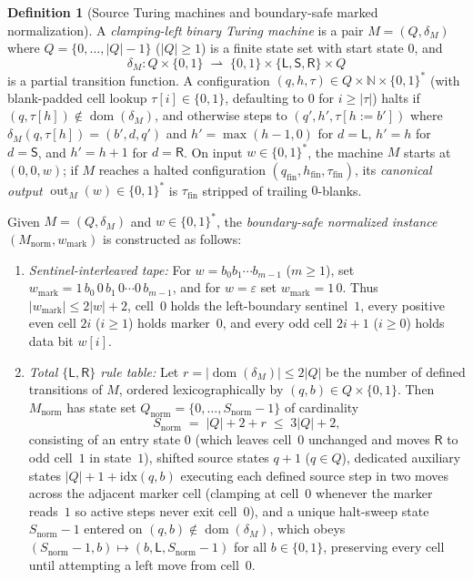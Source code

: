\documentclass[11pt,reqno]{amsart}
\numberwithin{equation}{section}
\theoremstyle{plain}
\theoremstyle{definition}
\newtheorem{definition}[theorem]{Definition}
\theoremstyle{remark}
\DeclareMathOperator{\out}{out}
\DeclareMathOperator{\dom}{dom}
\begin{document}
\begin{definition}[Source Turing machines and boundary-safe marked normalization]\label{def:source-norm}
A \emph{clamping-left binary Turing machine} is a pair $M = (Q, \delta_M)$ where $Q = \{0, \dots, |Q|-1\}$ ($|Q| \ge 1$) is a finite state set with start state $0$, and
\[
  \delta_M \colon Q \times \{0, 1\} \;\rightharpoonup\; \{0, 1\} \times \{\mathsf{L}, \mathsf{S}, \mathsf{R}\} \times Q
\]
is a partial transition function. A configuration $(q, h, \tau) \in Q \times \mathbb{N} \times \{0,1\}^*$ (with blank-padded cell lookup $\tau[i] \in \{0,1\}$, defaulting to $0$ for $i \ge |\tau|$) halts if $(q, \tau[h]) \notin \dom(\delta_M)$, and otherwise steps to $(q', h', \tau[h := b'])$ where $\delta_M(q, \tau[h]) = (b', d, q')$ and $h' = \max(h-1, 0)$ for $d = \mathsf{L}$, $h' = h$ for $d = \mathsf{S}$, and $h' = h + 1$ for $d = \mathsf{R}$. On input $w \in \{0,1\}^*$, the machine $M$ starts at $(0, 0, w)$; if $M$ reaches a halted configuration $(q_{\mathrm{fin}}, h_{\mathrm{fin}}, \tau_{\mathrm{fin}})$, its \emph{canonical output} $\out_M(w) \in \{0,1\}^*$ is $\tau_{\mathrm{fin}}$ stripped of trailing $0$-blanks.

Given $M = (Q, \delta_M)$ and $w \in \{0,1\}^*$, the \emph{boundary-safe normalized instance} $(M_{\mathrm{norm}}, w_{\mathrm{mark}})$ is constructed as follows:
\begin{enumerate}[label=(\roman*),leftmargin=2.2em]
  \item \emph{Sentinel-interleaved tape:} For $w = b_0 b_1 \cdots b_{m-1}$ ($m \ge 1$), set $w_{\mathrm{mark}} = 1\,b_0\,0\,b_1\,0\cdots 0\,b_{m-1}$, and for $w = \varepsilon$ set $w_{\mathrm{mark}} = 1\,0$. Thus $|w_{\mathrm{mark}}| \le 2|w| + 2$, cell~$0$ holds the left-boundary sentinel~$1$, every positive even cell $2i$ ($i \ge 1$) holds marker~$0$, and every odd cell $2i + 1$ ($i \ge 0$) holds data bit $w[i]$.
  \item \emph{Total $\{\mathsf{L},\mathsf{R}\}$ rule table:} Let $r = |\dom(\delta_M)| \le 2|Q|$ be the number of defined transitions of $M$, ordered lexicographically by $(q, b) \in Q \times \{0,1\}$. Then $M_{\mathrm{norm}}$ has state set $Q_{\mathrm{norm}} = \{0, \dots, S_{\mathrm{norm}}-1\}$ of cardinality
  \[
    S_{\mathrm{norm}} \;=\; |Q| + 2 + r \;\le\; 3|Q| + 2,
  \]
  consisting of an entry state $0$ (which leaves cell~$0$ unchanged and moves $\mathsf{R}$ to odd cell~$1$ in state~$1$), shifted source states $q + 1$ ($q \in Q$), dedicated auxiliary states $|Q| + 1 + \mathrm{idx}(q,b)$ executing each defined source step in two moves across the adjacent marker cell (clamping at cell~$0$ whenever the marker reads~$1$ so active steps never exit cell~$0$), and a unique halt-sweep state $S_{\mathrm{norm}} - 1$ entered on $(q,b) \notin \dom(\delta_M)$, which obeys $(S_{\mathrm{norm}}-1, b) \mapsto (b, \mathsf{L}, S_{\mathrm{norm}}-1)$ for all $b \in \{0,1\}$, preserving every cell until attempting a left move from cell~$0$.
\end{enumerate}
\end{definition}
\end{document}
